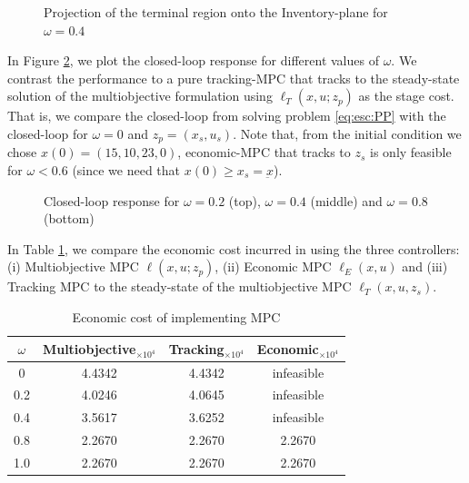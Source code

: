 \begin{figure}
\centering
\scriptsize
\resizebox{0.75\textwidth}{!}{}
\caption{Projection of the terminal region onto the Inventory-plane
  for $\omega = 0.4$}
\label{fig:esc:Xf4}
\end{figure}


In Figure \ref{fig:esc:CL}, we plot the closed-loop response for different
values of $\omega$. We contrast the performance to a pure tracking-MPC
that tracks to the steady-state solution of the multiobjective
formulation using $\ell_T(x,u;z_p)$ as the stage cost. That is, we
compare the closed-loop from solving problem \eqref{eq:esc:PP} with the
closed-loop for $\omega = 0$ and $z_p = (x_s,u_s)$. Note that, from the
initial condition we chose $x(0) = (15,10,23,0)$, economic-MPC that
tracks to $z_s$ is only feasible for $\omega < 0.6$ (since we need
that $x(0) \geq x_s = \underbar{x}$).  

\begin{figure}
\centering
\scriptsize
\resizebox{\textwidth}{!}{}
\resizebox{\textwidth}{!}{}
\resizebox{\textwidth}{!}{}
\caption{Closed-loop response for $\omega = 0.2$ (top), $\omega = 0.4$
(middle) and $\omega = 0.8$ (bottom)}
\label{fig:esc:CL}
\end{figure}

In Table \ref{tab:esc:CL}, we compare the economic cost incurred in using
the three controllers: (i) Multiobjective MPC $\ell(x,u;z_p)$, (ii)
Economic MPC $\ell_E(x,u)$ and (iii) Tracking MPC to the steady-state
of the multiobjective MPC $\ell_T(x,u,z_s)$. 

\begin{table}[h]
\caption{Economic cost of implementing MPC}
\label{tab:esc:CL}
\begin{center}
\begin{tabular}{cccc}\toprule
$\omega$ & Multiobjective$ _{ \times 10^{4}}$ & Tracking$ _{ \times 10^{4}}$ & Economic$ _{ \times 10^{4}}$ \\
\midrule
0 & 4.4342 & 4.4342 & infeasible \\
0.2 & 4.0246 & 4.0645 & infeasible \\
0.4 & 3.5617 & 3.6252 & infeasible \\
0.8 & 2.2670 & 2.2670 & 2.2670 \\
1.0 & 2.2670 & 2.2670 & 2.2670 \\
\bottomrule
\end{tabular}
\end{center}
\end{table}

